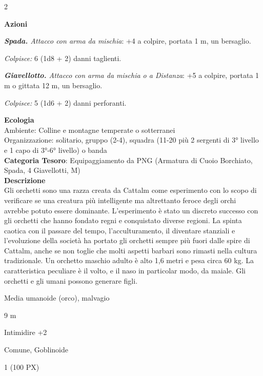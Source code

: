 \begin{multicols}{2}
{\textbf{Azioni}

\emph{\textbf{Spada.} Attacco con arma da mischia}: +4 a colpire, portata 1 m, un bersaglio.

\emph{Colpisce:} 6 (1d8 + 2) danni taglienti.

\emph{\textbf{Giavellotto.} Attacco con arma da mischia o a Distanza}: +5 a colpire, portata 1 m o gittata 12 m, un bersaglio.

\emph{Colpisce:} 5 (1d6 + 2) danni perforanti.

\textbf{Ecologia}\\
Ambiente: Colline e montagne temperate o sotterranei\\
Organizzazione: solitario, gruppo (2-4), squadra (11-20 più 2 sergenti di 3° livello e 1 capo di 3°-6° livello) o banda \\
\textbf{Categoria Tesoro}: Equipaggiamento da PNG (Armatura di Cuoio Borchiato, Spada, 4 Giavellotti, M)\\
\textbf{Descrizione}\\
Gli orchetti sono una razza creata da Cattalm come esperimento con lo scopo di verificare se una creatura più intelligente ma altrettanto feroce degli orchi avrebbe potuto essere dominante.
L'esperimento è stato un discreto successo con gli orchetti che hanno fondato regni e conquistato diverse regioni. La spinta caotica con il passare del tempo, l'acculturamento, il diventare stanziali e l'evoluzione della società ha portato gli orchetti sempre più fuori dalle spire di Cattalm, anche se non toglie che molti aspetti barbari sono rimasti nella cultura tradizionale.
Un orchetto maschio adulto è alto 1,6 metri e pesa circa 60 kg. La caratteristica peculiare è il volto, e il naso in particolar modo, da maiale. Gli orchetti e gli umani possono generare figli.

\begin{description}[noitemsep, topsep=0pt, parsep=0pt, partopsep=0pt, itemsep=1pt, leftmargin=2.35cm,  labelwidth=2.2cm, itemindent=0cm, listparindent=0pt] %
\setlength{\baselineskip}{10pt}
\item[\textbf{Taglia/Tipo}] Media umanoide (orco), malvagio
\item[\textbf{Caratt.}] 
\item[\textbf{Punti Ferita}] 
\item[\textbf{Movimento}] 9 m
\item[\textbf{Tiri Salvez.}] 
\item[\textbf{Comp.}] Intimidire +2
\item[\textbf{Sensi}] 
\item[\textbf{Linguaggi}] Comune, Goblinoide
\item[\textbf{Sfida}] 1 (100 PX)
\end{description}
\smallskip

}
\end{multicols}

